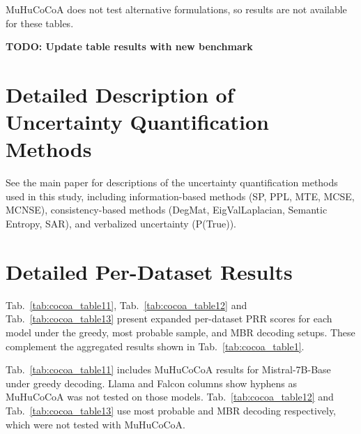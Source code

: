 \documentclass[11pt]{article}
\newcommand{\method}{MuHuCoCoA}
\newcommand{\tabref}[1]{Tab.~\ref{#1}}
\begin{document}
\method{} does not test alternative formulations, so results are not available for these tables.

\textbf{TODO: Update table results with new benchmark}


\section{Detailed Description of Uncertainty Quantification Methods}
\label{app:uq_methods}

See the main paper for descriptions of the uncertainty quantification methods used in this study, including information-based methods (SP, PPL, MTE, MCSE, MCNSE), consistency-based methods (DegMat, EigValLaplacian, Semantic Entropy, SAR), and verbalized uncertainty (P(True)).


\section{Detailed Per-Dataset Results}
\label{app:detailed_results}

\tabref{tab:cocoa_table11}, \tabref{tab:cocoa_table12} and \tabref{tab:cocoa_table13} present expanded per-dataset PRR scores for each model under the greedy, most probable sample, and MBR decoding setups. These complement the aggregated results shown in \tabref{tab:cocoa_table1}.

\tabref{tab:cocoa_table11} includes \method{} results for Mistral-7B-Base under greedy decoding. Llama and Falcon columns show hyphens as \method{} was not tested on those models. \tabref{tab:cocoa_table12} and \tabref{tab:cocoa_table13} use most probable and MBR decoding respectively, which were not tested with \method{}.
\end{document}
